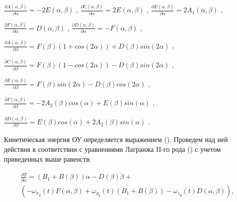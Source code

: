 \( \frac{ \partial A \left(  \alpha , \beta  \right) }{ \partial  \alpha }=-2E \left(  \alpha , \beta  \right)  \) ,   \( \frac{ \partial С \left(  \alpha , \beta  \right) }{ \partial  \alpha }=2E \left(  \alpha , \beta  \right)  \) ,   \( \frac{ \partial E \left(  \alpha , \beta  \right) }{ \partial  \alpha }=2A_{1} \left(  \alpha , \beta  \right)  \) ,\par

\( \frac{ \partial F \left(  \alpha , \beta  \right) }{ \partial  \alpha }=D \left(  \alpha , \beta  \right)  \) ,   \( \frac{ \partial D \left(  \alpha , \beta  \right) }{ \partial  \alpha }=-F \left(  \alpha , \beta  \right)  \) ,\par

\( \frac{ \partial A \left(  \alpha , \beta  \right) }{ \partial  \beta }=F \left(  \beta  \right)  \left( 1+cos \left( 2 \alpha  \right)  \right) +D \left(  \beta  \right) sin \left( 2 \alpha  \right)  \) ,\par

\( \frac{ \partial C \left(  \alpha , \beta  \right) }{ \partial  \beta }=F \left(  \beta  \right)  \left( 1-cos \left( 2 \alpha  \right)  \right) -D \left(  \beta  \right) sin \left( 2 \alpha  \right)  \) ,\par

\( \frac{ \partial E \left(  \alpha , \beta  \right) }{ \partial  \beta }=F \left(  \beta  \right) sin \left( 2 \alpha  \right) -D \left(  \beta  \right) cos \left( 2 \alpha  \right)  \) ,\par

\( \frac{ \partial F \left(  \alpha , \beta  \right) }{ \partial  \beta }=-2A_{2} \left(  \beta  \right) cos \left(  \alpha  \right) +E \left(  \beta  \right) sin \left(  \alpha  \right)  \) ,\par

\( \frac{ \partial D \left(  \alpha , \beta  \right) }{ \partial  \beta }=E \left(  \beta  \right) cos \left(  \alpha  \right) +2A_{2} \left(  \beta  \right) sin \left(  \alpha  \right)  \) .\par

Кинетическая энергия ОУ определяется выражением (). Проведем над ней действия в соответствии с уравнениями Лагранжа II-го рода () с учетом приведенных выше равенств:\par

\begin{equation}%
\label{eq:p3:42}
\begin{multlined}
\frac{\partial T}{\partial \dot \alpha}= 
(B_1 + B(\beta)) \dot{\alpha} - 
 D(\beta) \dot{\beta} + \\
(
	-\omega_{x_y} (t) F(\alpha, \beta)
	+\omega_{y_y} (t) (B_1 + B(\beta))
	-\omega_{z_y} (t) D(\alpha, \beta)
)  ,
\end{multlined}
\end{equation}

